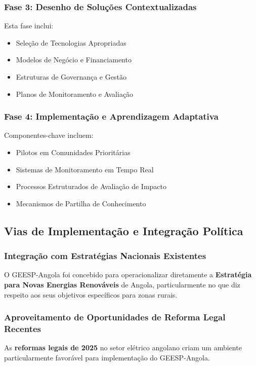 \documentclass[12pt, a4paper]{article}
\begin{document}
\subsubsection{Fase 3: Desenho de Soluções Contextualizadas}

Esta fase inclui:
\begin{itemize}
\item Seleção de Tecnologias Apropriadas
\item Modelos de Negócio e Financiamento
\item Estruturas de Governança e Gestão
\item Planos de Monitoramento e Avaliação
\end{itemize}

\subsubsection{Fase 4: Implementação e Aprendizagem Adaptativa}

Componentes-chave incluem:
\begin{itemize}
\item Pilotos em Comunidades Prioritárias
\item Sistemas de Monitoramento em Tempo Real
\item Processos Estruturados de Avaliação de Impacto
\item Mecanismos de Partilha de Conhecimento
\end{itemize}

\subsection{Vias de Implementação e Integração Política}

\subsubsection{Integração com Estratégias Nacionais Existentes}

O GEESP-Angola foi concebido para operacionalizar diretamente a \textbf{Estratégia para Novas Energias Renováveis} de Angola, particularmente no que diz respeito aos seus objetivos específicos para zonas rurais.

\subsubsection{Aproveitamento de Oportunidades de Reforma Legal Recentes}

As \textbf{reformas legais de 2025} no setor elétrico angolano criam um ambiente particularmente favorável para implementação do GEESP-Angola.
\end{document}
